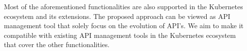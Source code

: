 Most of the aforementioned functionalities are also supported in the Kubernetes ecosystem and its extensions.
The proposed approach can be viewed as API management tool that solely focus on the evolution of API's.
We aim to make it compatible with existing API management tools in the Kubernetes ecosystem that cover the other functionalities.

